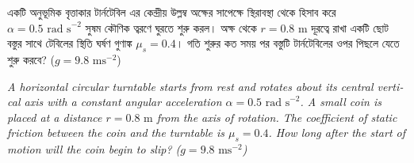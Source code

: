 \documentclass[12pt, a4paper]{article}
\begin{document}
{{\newpage

\begin{tcolorbox}[questionbox={প্রশ্ন (Question) 17}]
    \noindent
    একটি অনুভূমিক বৃত্তাকার টার্নটেবিল এর কেন্দ্রীয় উল্লম্ব অক্ষের সাপেক্ষে স্থিরাবস্থা থেকে হিসাব করে $\alpha = 0.5\text{ rad s}^{-2}$ সুষম কৌণিক ত্বরণে ঘুরতে শুরু করল। অক্ষ থেকে $r = 0.8\text{ m}$ দূরত্বে রাখা একটি ছোট বস্তুর সাথে টেবিলের স্থিতি ঘর্ষণ গুণাঙ্ক $\mu_s = 0.4$। গতি শুরুর কত সময় পর বস্তুটি টার্নটেবিলের ওপর পিছলে যেতে শুরু করবে? ($g = 9.8\text{ ms}^{-2}$)
    
    \vspace{0.8em}
    \begin{english}
    \noindent\textit{\color{darkgray}
    A horizontal circular turntable starts from rest and rotates about its central vertical axis with a constant angular acceleration $\alpha = 0.5\text{ rad s}^{-2}$. A small coin is placed at a distance $r = 0.8\text{ m}$ from the axis of rotation. The coefficient of static friction between the coin and the turntable is $\mu_s = 0.4$. How long after the start of motion will the coin begin to slip? ($g = 9.8\text{ ms}^{-2}$)
    }
    \end{english}
\end{tcolorbox}

\vspace{1em}
\begin{center}
\end{center}
\vspace{1em}

}}
\end{document}
